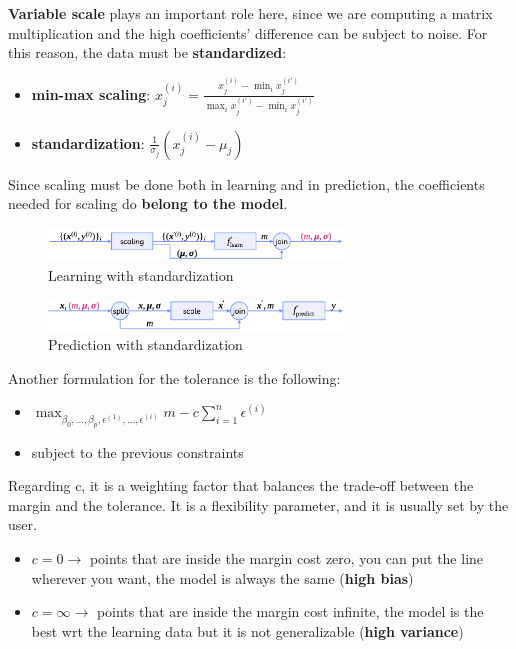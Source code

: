 \textbf{Variable scale} plays an important role here, since we are computing a matrix multiplication and the high coefficients' difference can be subject to noise. For this reason, the data must be \textbf{standardized}:
\begin{itemize}
    \item \textbf{min-max scaling}: $x^{(i)}_j = \frac{x^{(i)}_j - \operatorname*{min}_i x^{(i')}_j}{\operatorname*{max}_i x^{(i')}_j - \operatorname*{min}_i x^{(i')}_j}$
    \item \textbf{standardization}: $\frac{1}{\sigma_j} (x^{(i)}_j - \mu_j)$
\end{itemize}

Since scaling must be done both in learning and in prediction, the coefficients needed for scaling do \textbf{belong to the model}.

\begin{center}
    \begin{figure}[H]
        \centering
        \includegraphics[width=0.7\textwidth]{assets/fig29.png}
        \caption{Learning with standardization}
    \end{figure}
\end{center}

\begin{center}
    \begin{figure}[H]
        \centering
        \includegraphics[width=0.7\textwidth]{assets/fig30.png}
        \caption{Prediction with standardization}
    \end{figure}
\end{center}

Another formulation for the tolerance is the following:
\begin{itemize}
    \item $\operatorname*{max}_{\beta_0,\dots,\beta_p,\epsilon^{(1)},\dots,\epsilon^{(i)}} m - c\sum_{i=1}^{n}\epsilon^{(i)}$
    \item subject to the previous constraints
\end{itemize}

Regarding c, it is a weighting factor that balances the trade-off between the margin and the tolerance. It is a flexibility parameter, and it is usually set by the user.
\begin{itemize}
    \item $c = 0 \to$ points that are inside the margin cost zero, you can put the line wherever you want, the model is always the same (\textbf{high bias})
    \item $c = \infty \to$ points that are inside the margin cost infinite, the model is the best wrt the learning data but it is not generalizable (\textbf{high variance})
\end{itemize}

